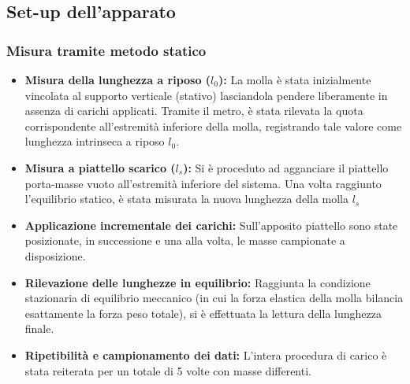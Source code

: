 \documentclass[a4paper,12pt]{article}
\begin{document}
\subsection{Set-up dell'apparato}     
\subsubsection{Misura tramite metodo statico}
\begin{itemize}
    \item \textbf{Misura della lunghezza a riposo ($l_0$):} La molla è stata inizialmente vincolata al supporto verticale (stativo) lasciandola pendere liberamente in assenza di carichi applicati. Tramite il metro, è stata rilevata la quota corrispondente all'estremità inferiore della molla, registrando tale valore come lunghezza intrinseca a riposo $l_0$.
    
    \item \textbf{Misura a piattello scarico ($l_s$):} Si è proceduto ad agganciare il piattello porta-masse vuoto all'estremità inferiore del sistema. Una volta raggiunto l'equilibrio statico, è stata misurata la nuova lunghezza della molla $l_s$
    
    \item \textbf{Applicazione incrementale dei carichi:} Sull'apposito piattello sono state posizionate, in successione e una alla volta, le masse campionate a disposizione.
    
    \item \textbf{Rilevazione delle lunghezze in equilibrio:} Raggiunta la condizione stazionaria di equilibrio meccanico (in cui la forza elastica della molla bilancia esattamente la forza peso totale), si è effettuata la lettura della lunghezza finale.
    
    \item \textbf{Ripetibilità e campionamento dei dati:} L'intera procedura di carico è stata reiterata per un totale di 5 volte con masse differenti.
\end{itemize}
\end{document}
